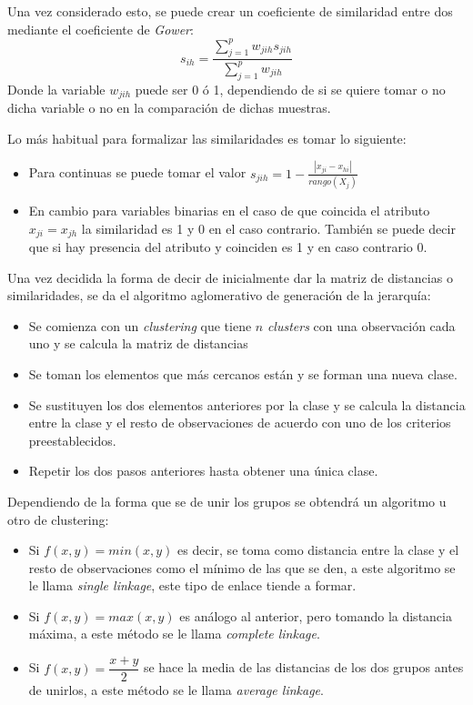 \noindent Una vez considerado esto, se puede crear un coeficiente de similaridad entre dos mediante el coeficiente de \emph{Gower}:
\begin{equation}
s_{ih}=\dfrac{\sum_{j=1}^{p}w_{jih}s_{jih}}{\sum_{j=1}^{p}w_{jih}}
\end{equation}
\noindent Donde la variable $w_{jih}$ puede ser 0 ó 1, dependiendo de si se quiere tomar o no dicha variable o no en la comparación de dichas muestras. 

\noindent Lo más habitual para formalizar las similaridades es tomar lo siguiente:
\begin{itemize}
\item Para continuas se puede tomar el valor $s_{jih}=1-\frac{|x_{ji}-x_{hi}|}{rango(X_j)}$
\item En cambio para variables binarias en el caso de que coincida el atributo $x_{ji}=x_{jh}$ la similaridad es 1 y 0 en el caso contrario. También se puede decir que si hay presencia del atributo y coinciden es 1 y en caso contrario 0. 
\end{itemize}

\noindent Una vez decidida la forma de decir de inicialmente dar la matriz de distancias o similaridades, se da el algoritmo aglomerativo de generación de la jerarquía:
\begin{itemize}
\item Se comienza con un \emph{clustering} que tiene $n$ \emph{clusters} con una observación cada uno y se calcula la matriz de distancias
\item Se toman los elementos que más cercanos están y se forman una nueva clase.
\item Se sustituyen los dos elementos anteriores por la clase y se calcula la distancia entre la clase y el resto de observaciones de acuerdo con uno de los criterios preestablecidos. 
\item Repetir los dos pasos anteriores hasta obtener una única clase. 
\end{itemize}

\noindent Dependiendo de la forma que se de unir los grupos se obtendrá un algoritmo u otro de clustering:
\begin{itemize}
\item Si $f(x,y)=min(x,y)$ es decir, se toma como distancia entre la clase y el resto de observaciones como el mínimo de las que se den, a este algoritmo se le llama \textit{single linkage}, este tipo de enlace tiende a formar.
\item  Si $f(x,y)=max(x,y)$ es análogo al anterior, pero tomando la distancia máxima, a este método se le llama \textit{complete linkage}.
\item  Si $f(x,y)=\dfrac{x+y}{2}$ se hace la media de las distancias de los dos grupos antes de unirlos, a este método se le llama \textit{average linkage}.
\end{itemize}

